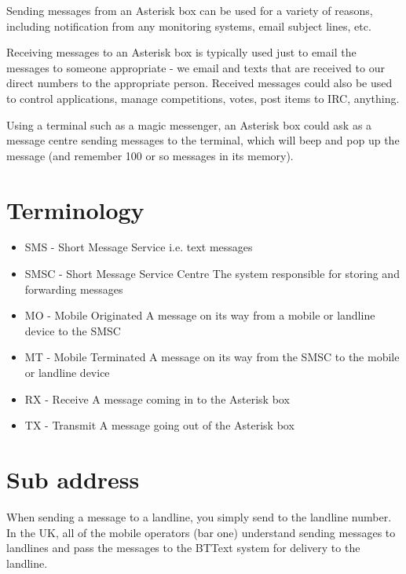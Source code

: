    Sending messages from an Asterisk box can be used for a variety of
   reasons, including notification from any monitoring systems, email
   subject lines, etc.

   Receiving messages to an Asterisk box is typically used just to email
   the messages to someone appropriate - we email and texts that are
   received to our direct numbers to the appropriate person. Received
   messages could also be used to control applications, manage
   competitions, votes, post items to IRC, anything.

   Using a terminal such as a magic messenger, an Asterisk box could ask
   as a message centre sending messages to the terminal, which will beep
   and pop up the message (and remember 100 or so messages in its
   memory).

\section{Terminology}

\begin{itemize}
   \item SMS -
   Short Message Service
   i.e. text messages

   \item SMSC -
   Short Message Service Centre
   The system responsible for storing and forwarding messages

   \item MO -
   Mobile Originated
   A message on its way from a mobile or landline device to the SMSC

   \item MT -
   Mobile Terminated
   A message on its way from the SMSC to the mobile or landline device

   \item RX -
   Receive
   A message coming in to the Asterisk box

   \item TX -
   Transmit
   A message going out of the Asterisk box
\end{itemize}

\section{Sub address}

   When sending a message to a landline, you simply send to the landline
   number. In the UK, all of the mobile operators (bar one) understand
   sending messages to landlines and pass the messages to the BTText
   system for delivery to the landline.

